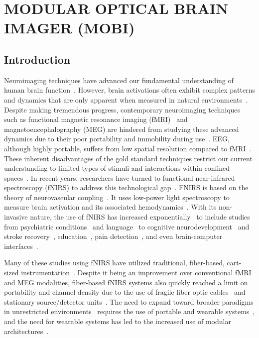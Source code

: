 
\chapter{MODULAR OPTICAL BRAIN IMAGER (MOBI)} %
\label{chap:mobi}


\section{Introduction} %
\label{chap:mobi:introduction}
Neuroimaging techniques have advanced our fundamental understanding of human brain function~\cite{Crum2021}. However, brain activations often exhibit complex patterns and dynamics that are only apparent when measured in natural environments~\cite{Park2018, Crum2021}. Despite making tremendous progress, contemporary neuroimaging techniques such as functional magnetic resonance imaging (fMRI)~\cite{Heinzel2013} and magnetoencephalography (MEG) are hindered from studying these advanced dynamics due to their poor portability and immobility during use~\cite{Herold2017, Yucel2017}. EEG, although highly portable, suffers from low spatial resolution compared to fMRI~\cite{Sirpal2019, Herold2017}. These inherent disadvantages of the gold standard techniques restrict our current understanding to limited types of stimuli and interactions within confined spaces~\cite{Park2018}. In recent years, researchers have turned to functional near-infrared spectroscopy (fNIRS) to address this technological gap~\cite{Boas2014}. FNIRS is based on the theory of neurovascular coupling~\cite{Ferrari2012}. It uses low-power light spectroscopy to measure brain activation and its associated hemodynamics~\cite{Boas2014}. With its non-invasive nature, the use of fNIRS has increased exponentially~\cite{Quaresima2019, Yucel2017} to include studies from psychiatric conditions~\cite{Ehlis2014, Kumar2017} and language~\cite{Quaresima2012, Rossi2012, Jackson2019} to cognitive neurodevelopment~\cite{Aslin2015, Vanderwert2014, Wilcox2015, Soltanlou2018} and stroke recovery~\cite{Yang2019}, education~\cite{Brockington2018}, pain detection~\cite{LopezMartinez2019}, and even brain-computer interfaces~\cite{Naseer2015, Ahn2017, Hong2018}.

Many of these studies using fNIRS have utilized traditional, fiber-based, cart-sized instrumentation~\cite{Scholkmann2014, Eggebrecht2014, Wheelock2019, Everdell2005}. Despite it being an improvement over conventional fMRI and MEG modalities, fiber-based fNIRS systems also quickly reached a limit on portability and channel density due to the use of fragile fiber optic cables~\cite{Saikia2019, Zhao2019} and stationary source/detector units~\cite{Oxymon2017, Techen2018}. The need to expand toward broader paradigms in unrestricted environments~\cite{Crum2021} requires the use of portable and wearable systems~\cite{Curtin2018, Park2018}, and the need for wearable systems has led to the increased use of modular architectures~\cite{Bci2017, Zimmermann2013, Funane2017, Wyser2017, Zhao2020, VidalRosas2021, Liu2022}. 

